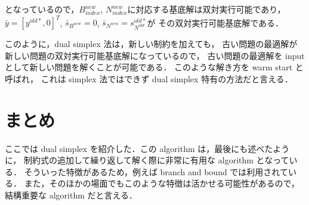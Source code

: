\documentclass[11pt, a4]{article}
\begin{document}
となっているので，$B_{index}^{new}$, $N^{new}_{index}$に対応する基底解は双対実行可能であり，
${\bar y} = [y^{old*}, 0]^T$, ${\bar s}_{B^{new}} = 0$, ${\bar s}_{N^{new}} = s^{old*}_{N^{old}}$が
その双対実行可能基底解である．

このように，dual simplex 法は，新しい制約を加えても，
古い問題の最適解が新しい問題の双対実行可能基底解になっているので，
古い問題の最適解を input として新しい問題を解くことが可能である．
このような解き方を warm start と呼ばれ，
これは simplex 法ではできず dual simplex 特有の方法だと言える．

\section{まとめ}
ここでは dual simplex を紹介した．この algorithm は，最後にも述べたように，
制約式の追加して繰り返して解く際に非常に有用な algorithm となっている．
そういった特徴があるため，例えば branch and bound では利用されている．
また，そのほかの場面でもこのような特徴は活かせる可能性があるので，
結構重要な algorithm だと言える．
\end{document}
